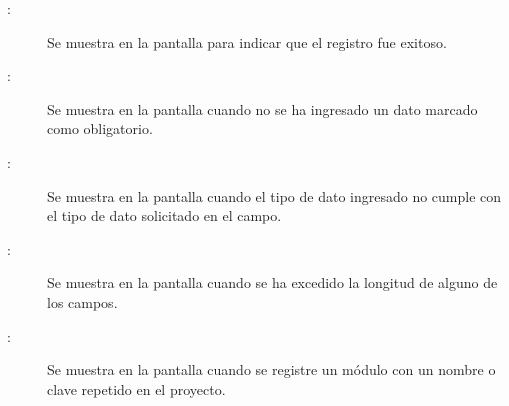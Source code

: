 \begin{description}
	\item[:] Se muestra en la pantalla  para indicar que el registro fue exitoso.
	\item[:] Se muestra en la pantalla  cuando no se ha ingresado un dato marcado como obligatorio.
	\item[:] Se muestra en la pantalla  cuando el tipo de dato ingresado no cumple con el tipo de dato solicitado en el campo.
	\item[:] Se muestra en la pantalla  cuando se ha excedido la longitud de alguno de los campos.
	\item[:] Se muestra en la pantalla  cuando se registre un módulo con un nombre o clave repetido en el proyecto.
\end{description}
